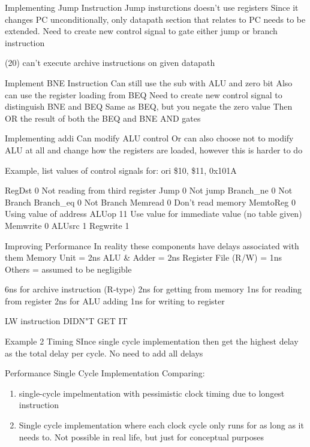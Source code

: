 \documentclass{article}
\begin{document}
		Implementing Jump Instruction
			Jump insturctions doesn't use registers
			Since it changes PC unconditionally, only datapath section that relates to PC needs to be extended. 
			Need to create new control signal to gate either jump or branch instruction

		(20) can't execute archive instructions on given datapath 

		Implement BNE Instruction
			Can still use the sub with ALU and zero bit
			Also can use the register loading from BEQ
			Need to create new control signal to distinguish BNE and BEQ
				Same as BEQ, but you negate the zero value
			Then OR the result  of both the BEQ and BNE AND gates

		Implementing addi
			Can modify ALU control
			Or can also choose not to modify ALU at all and change how the registers are loaded, however this is harder to do


		Example, list values of control signals for:   
			ori \$10, \$11, 0x101A

			RegDst		0	Not reading from third register
			Jump		0	Not jump
			Branch\_ne	0	Not Branch
			Branch\_eq	0	Not Branch
			Memread		0	Don't read memory
			MemtoReg	0	Using value of address
			ALUop		11	Use value for immediate value (no table given)
			Memwrite	0
			ALUsrc		1
			Regwrite	1

	Improving Performance
		In reality these components have delays associated with them
		Memory Unit = 2ns
		ALU \& Adder = 2ns
		Register File (R/W) = 1ns
		Others = assumed to be negligible

		6ns for archive instruction (R-type)
			2ns for getting from memory
			1ns for reading from register
			2ns for ALU adding
			1ns for writing to register

		LW instruction
			DIDN"T GET IT

		Example 2
			Timing
				SInce single cycle implementation then get the highest delay as the total delay per cycle. No need to add all delays

		Performance Single Cycle Implementation
			Comparing:
			\begin{enumerate}
				\item single-cycle impelmentation with pessimistic clock timing due to longest instruction
				\item Single cycle implementation where each clock cycle only runs for as long as it needs to. Not possible in real life, but just for conceptual purposes
			\end{enumerate}
\end{document}
